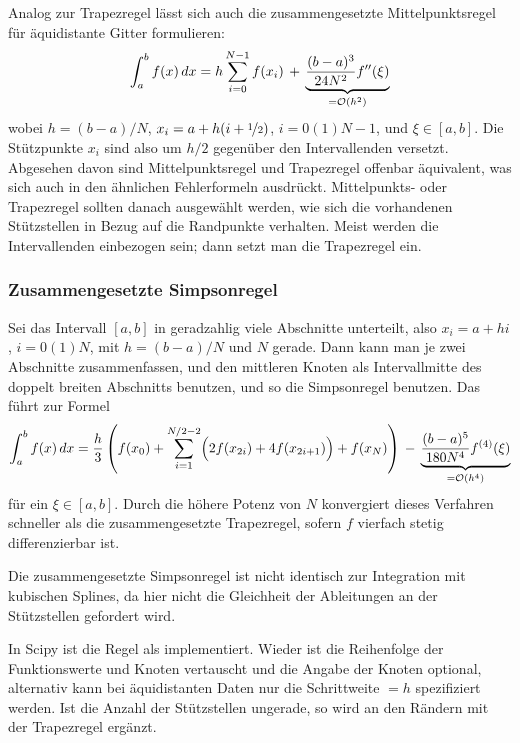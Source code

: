 Analog zur Trapezregel lässt sich auch die zusammengesetzte
Mittelpunktsregel für äquidistante Gitter formulieren:
\begin{equation}
  \int_a^b f(x)\, dx =
  h\sum_{i=0}^{N-1} f(x_i) 
  \,+\, \underbrace{\frac{(b-a)^3}{24 N^2}f''(\xi)}_{=\mathcal O(h^2)}
\end{equation}
wobei $h=(b-a)/N$, $x_i = a + h(i+\nicefrac{1}{2})$, $i=0(1)N-1$, und
$\xi\in [a,b]$. Die Stützpunkte $x_i$ sind also um $h/2$ gegenüber den
Intervallenden versetzt. Abgesehen davon sind Mittelpunktsregel und
Trapezregel offenbar äquivalent, was sich auch in den ähnlichen
Fehlerformeln ausdrückt. Mittelpunkts- oder Trapezregel sollten danach
ausgewählt werden, wie sich die vorhandenen Stützstellen in Bezug auf
die Randpunkte verhalten. Meist werden die Intervallenden einbezogen
sein; dann setzt man die Trapezregel ein.

\subsubsection{Zusammengesetzte Simpsonregel}

Sei das Intervall $[a,b]$ in geradzahlig viele Abschnitte unterteilt,
also $x_i = a + hi$, $i=0(1)N$, mit $h=(b-a)/N$ und $N$ gerade. Dann
kann man je zwei Abschnitte zusammenfassen, und den mittleren Knoten
als Intervallmitte des doppelt breiten Abschnitts benutzen, und so die
Simpsonregel benutzen. Das führt zur Formel
\begin{equation}
  \int_a^b f(x)\, dx =
  \frac{h}{3}\left(
    f(x_0) +
    \sum_{i=1}^{N/2-2} \Bigl(2 f(x_{2i}) + 4 f(x_{2i+1})\Bigr)
    + f(x_N)
  \right)
  \, - \, \underbrace{\frac{(b-a)^5}{180 N^4} f^{(4)}(\xi)}_{=\mathcal O(h^4)}
\end{equation}
für ein $\xi\in [a,b]$. Durch die höhere Potenz von $N$ konvergiert
dieses Verfahren schneller als die zusammengesetzte Trapezregel,
sofern $f$ vierfach stetig differenzierbar ist.

Die zusammengesetzte Simpsonregel ist nicht identisch zur Integration
mit kubischen Splines, da hier nicht die Gleichheit der Ableitungen an
der Stützstellen gefordert wird.

In Scipy ist die Regel als 
implementiert. Wieder ist die Reihenfolge der Funktionswerte 
und Knoten  vertauscht und die Angabe der Knoten optional,
alternativ kann bei äquidistanten Daten nur die Schrittweite
$=h$ spezifiziert werden. Ist die Anzahl der Stützstellen
ungerade, so wird an den Rändern mit der Trapezregel ergänzt.

